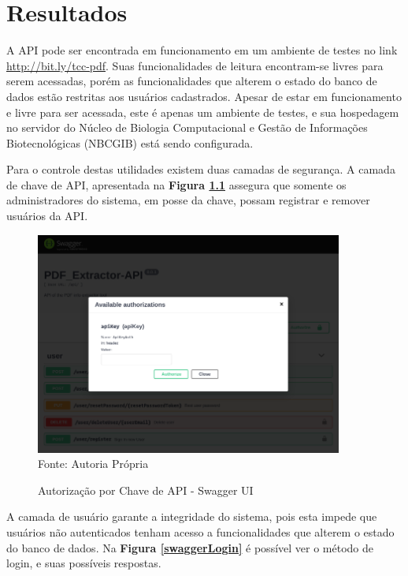 \chapter{Resultados} \label{resultados}

A API pode ser encontrada em funcionamento em um ambiente de testes no link \href{http://bit.ly/tcc-pdf}{http://bit.ly/tcc-pdf}. Suas funcionalidades de leitura encontram-se livres para serem acessadas, porém as funcionalidades que alterem o estado do banco de dados estão restritas aos usuários cadastrados. Apesar de estar em funcionamento e livre para ser acessada, este é apenas um ambiente de testes, e sua hospedagem no servidor do Núcleo de Biologia Computacional e Gestão de Informações Biotecnológicas (NBCGIB) está sendo configurada.

Para o controle destas utilidades existem duas camadas de segurança. 
A camada de chave de API, apresentada na \textbf{Figura \ref{swaggerAPIKey}} assegura que somente os administradores do sistema, em posse da chave, possam registrar e remover usuários da API.

\begin{figure}[H]
\centering
\captionsetup{justification   = raggedright,
              singlelinecheck = false}
\caption{Autorização por Chave de API - Swagger UI}\label{swaggerAPIKey}
\includegraphics[width=0.9\textwidth]{figs/swaggerAPIKey.png}
\footnotesize Fonte: Autoria Própria
\end{figure}

A camada de usuário garante a integridade do sistema, pois esta impede que usuários não autenticados tenham acesso a funcionalidades que alterem o estado do banco de dados. Na \textbf{Figura \ref{swaggerLogin}} é possível ver o método de login, e suas possíveis respostas.

